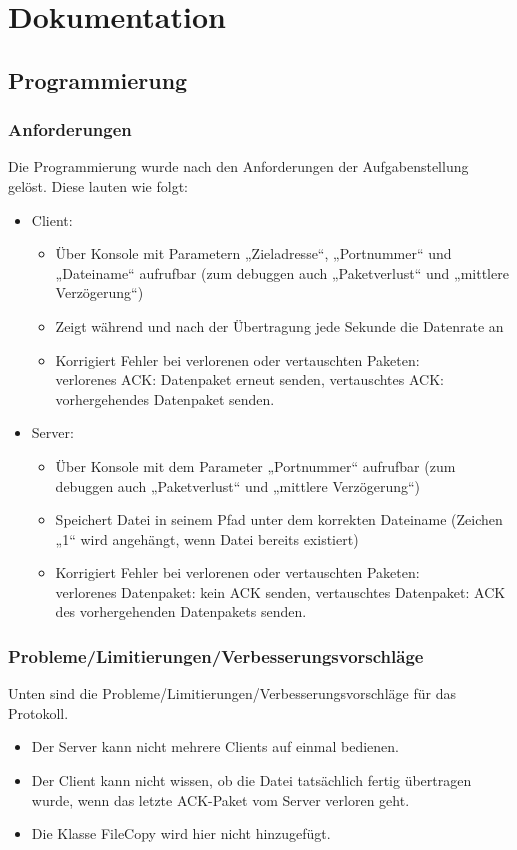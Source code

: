 \chapter{Dokumentation}

\section{Programmierung}
\label{programing}

\subsection{Anforderungen}
Die Programmierung wurde nach den Anforderungen der Aufgabenstellung gelöst. Diese lauten wie folgt:
\begin{itemize}
\item Client:
\begin{itemize}
\item Über Konsole mit Parametern „Zieladresse“, „Portnummer“ und „Dateiname“ aufrufbar (zum debuggen auch „Paketverlust“ und „mittlere Verzögerung“)
\item Zeigt während und nach der Übertragung jede Sekunde die Datenrate an
\item Korrigiert Fehler bei verlorenen oder vertauschten Paketen:\\
verlorenes ACK: Datenpaket erneut senden, vertauschtes ACK: vorhergehendes Datenpaket senden.
\end{itemize}
\item Server:
\begin{itemize}
\item Über Konsole mit dem Parameter „Portnummer“ aufrufbar (zum debuggen auch „Paketverlust“ und „mittlere Verzögerung“)
\item Speichert Datei in seinem Pfad unter dem korrekten Dateiname (Zeichen „1“ wird angehängt, wenn Datei bereits existiert)
\item Korrigiert Fehler bei verlorenen oder vertauschten Paketen:\\
verlorenes Datenpaket: kein ACK senden, vertauschtes Datenpaket: ACK des vorhergehenden Datenpakets senden.
\end{itemize}
\end{itemize}

\subsection{Probleme/Limitierungen/Verbesserungsvorschläge}
\label{abgrenz}
Unten sind die Probleme/Limitierungen/Verbesserungsvorschläge für das Protokoll.
\begin{itemize}
\item Der Server kann nicht mehrere Clients auf einmal bedienen.
\item Der Client kann nicht wissen, ob die Datei tatsächlich fertig übertragen wurde, wenn das letzte ACK-Paket vom Server verloren geht.
\item Die Klasse FileCopy wird hier nicht hinzugefügt.
\end{itemize}

